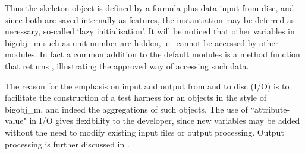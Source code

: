 Thus the skeleton object is defined by a formula plus data input from disc,
and since both are saved internally as features, the instantiation may be deferred as necessary,
so-called `lazy initialisation'.
It will be noticed that other variables in bigobj\_m such as unit number are hidden, ie.\ cannot be accessed by
other modules. In fact a common addition to the default modules is a method function  that returns ,
illustrating the approved way of accessing such data.

The reason for the emphasis on input and output from and to disc (I/O)
is to facilitate the construction of a test harness
for an objects in the style of bigobj\_m, and indeed the aggregations of such objects.  
The use of ``attribute-value" in I/O gives flexibility to the developer, since new variables may be
added without the need to modify existing input files or output processing. Output processing is further
discussed in .

